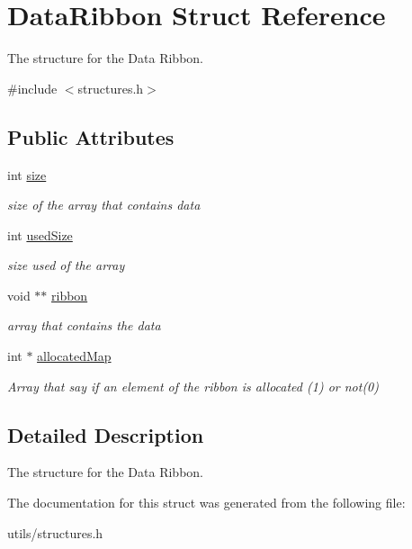\hypertarget{structDataRibbon}{}\section{Data\+Ribbon Struct Reference}
\label{structDataRibbon}


The structure for the Data Ribbon.  




{\ttfamily \#include $<$structures.\+h$>$}

\subsection*{Public Attributes}
\begin{DoxyCompactItemize}
\item 
\mbox{\label{structDataRibbon_a73207b4f107779b04d8657658b734495}} 
int \hyperlink{structDataRibbon_a73207b4f107779b04d8657658b734495}{size}
\begin{DoxyCompactList}\small\item\em size of the array that contains data \end{DoxyCompactList}\item 
\mbox{\label{structDataRibbon_a18fadaaa4662125922b4c432245adf3b}} 
int \hyperlink{structDataRibbon_a18fadaaa4662125922b4c432245adf3b}{used\+Size}
\begin{DoxyCompactList}\small\item\em size used of the array \end{DoxyCompactList}\item 
\mbox{\label{structDataRibbon_a1e46999166f48122a974d11fc1d00f4c}} 
void $\ast$$\ast$ \hyperlink{structDataRibbon_a1e46999166f48122a974d11fc1d00f4c}{ribbon}
\begin{DoxyCompactList}\small\item\em array that contains the data \end{DoxyCompactList}\item 
\mbox{\label{structDataRibbon_a76e03f2eb05be8f3cf963183ae6a5b9e}} 
int $\ast$ \hyperlink{structDataRibbon_a76e03f2eb05be8f3cf963183ae6a5b9e}{allocated\+Map}
\begin{DoxyCompactList}\small\item\em Array that say if an element of the ribbon is allocated (1) or not(0) \end{DoxyCompactList}\end{DoxyCompactItemize}


\subsection{Detailed Description}
The structure for the Data Ribbon. 

The documentation for this struct was generated from the following file\+:\begin{DoxyCompactItemize}
\item 
utils/structures.\+h\end{DoxyCompactItemize}
